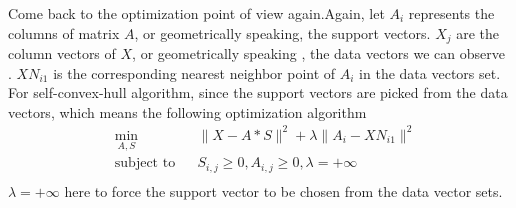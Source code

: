 \documentclass[14pt]{book}
\begin{document}
\par Come back to the optimization point of view again.Again, let $A_i$ represents the columns of matrix $A$, or geometrically speaking, the support vectors. $X_j$ are the column vectors of $X$, or geometrically speaking , the data vectors we can observe . $XN_{i1}$ is the corresponding nearest neighbor point of $A_i$ in the data vectors set. For self-convex-hull algorithm, since the support vectors are picked from the data vectors, which means the following optimization algorithm
\begin{equation}
\begin{aligned}
& \underset{A,S}{\text{min}}
& & \parallel X-A*S \parallel ^2 + \lambda \parallel A_i-XN_{i1} \parallel^2  \\
& \text{subject to}
& & S_{i,j}\geq 0,A_{i,j}\geq 0, \lambda = +\infty\\
\end{aligned}
\end{equation}
$\lambda = +\infty$ here to force the support vector to be chosen from the data vector sets. 
\setcounter{chapter}{3}
\setcounter{equation}{0} %
\end{document}
